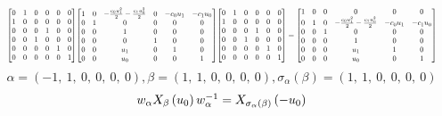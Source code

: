\documentclass[11pt]{article}
\theoremstyle{definition}
\begin{document}
\[
\scaletoalign{\textwidth}{{\left[\begin{matrix}0 & 1 & 0 & 0 & 0 & 0\\1 & 0 & 0 & 0 & 0 & 0\\0 & 0 & 0 & 1 & 0 & 0\\0 & 0 & 1 & 0 & 0 & 0\\0 & 0 & 0 & 0 & 1 & 0\\0 & 0 & 0 & 0 & 0 & 1\end{matrix}\right]} {\left[\begin{matrix}1 & 0 & - \frac{c_{0} u_{1}^{2}}{2} - \frac{c_{1} u_{0}^{2}}{2} & 0 & - c_{0} u_{1} & - c_{1} u_{0}\\0 & 1 & 0 & 0 & 0 & 0\\0 & 0 & 1 & 0 & 0 & 0\\0 & 0 & 0 & 1 & 0 & 0\\0 & 0 & u_{1} & 0 & 1 & 0\\0 & 0 & u_{0} & 0 & 0 & 1\end{matrix}\right]} {\left[\begin{matrix}0 & 1 & 0 & 0 & 0 & 0\\1 & 0 & 0 & 0 & 0 & 0\\0 & 0 & 0 & 1 & 0 & 0\\0 & 0 & 1 & 0 & 0 & 0\\0 & 0 & 0 & 0 & 1 & 0\\0 & 0 & 0 & 0 & 0 & 1\end{matrix}\right]} = {\left[\begin{matrix}1 & 0 & 0 & 0 & 0 & 0\\0 & 1 & 0 & - \frac{c_{0} u_{1}^{2}}{2} - \frac{c_{1} u_{0}^{2}}{2} & - c_{0} u_{1} & - c_{1} u_{0}\\0 & 0 & 1 & 0 & 0 & 0\\0 & 0 & 0 & 1 & 0 & 0\\0 & 0 & 0 & u_{1} & 1 & 0\\0 & 0 & 0 & u_{0} & 0 & 1\end{matrix}\right]}}
\]
\[
\alpha = \left( -1, \  1, \  0, \  0, \  0, \  0\right), \beta = \left( 1, \  1, \  0, \  0, \  0, \  0\right), \sigma_{\alpha}(\beta) = \left( 1, \  1, \  0, \  0, \  0, \  0\right)
\]
\[
\scaletoalign{\textwidth}{w_{\alpha} X_{\beta}\left(u_{0}\right) w_{\alpha}^{-1} = X_{\sigma_{\alpha}\left(\beta\right)}\left(- u_{0}\right)}
\]
\end{document}
